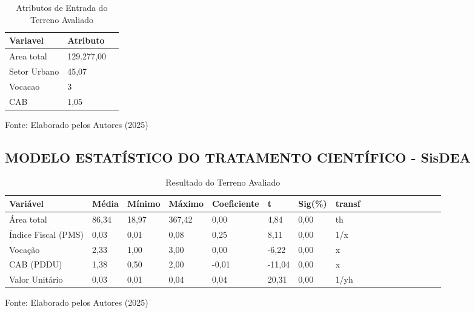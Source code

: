 \begin{table}[ht]
	\centering
	\begin{threeparttable}
		\caption{Atributos de Entrada do Terreno Avaliado }
		\label{Tabela-entrada-avaliado}
		\begin{tabular}{p{13.0cm}l  l}
			\toprule
			Variavel & Atributo    	 \\\midrule
			Area total	& 129.277,00 	 \\	 
			Setor Urbano	& 45,07 \\	 
			Vocacao	&3     \\	 
			CAB	& 1,05    \\\bottomrule
		\end{tabular}%
		\begin{tablenotes}
			\item [{\normalsize Fonte:     Elaborado pelos Autores (2025)}]  
		\end{tablenotes}
	\end{threeparttable}
\end{table}

\subsection{MODELO ESTATÍSTICO DO TRATAMENTO CIENTÍFICO - SisDEA}

\begin{table}[h!t]
	\centering
	\begin{threeparttable}
		\caption{Resultado do Terreno Avaliado }
		\label{Tabela-entrada-avalia5do}
		\begin{tabular}{p{2.5cm}lp{1.0cm}lp{2.5cm}lp{1.0cm}lp{1.5cm}lp{2.0cm}lp{1.0cm}lp{1.0cm}ll}
			\toprule
			Variável&	Média&	Mínimo&	Máximo&	Coeficiente&	t&	Sig(\%)	&transf 	 \\\midrule
			Área total&	86,34&	18,97&	367,42&	0,00&	4,84&	0,00&	th\\ 
			Índice Fiscal (PMS)&	0,03&	0,01&	0,08&	0,25&	8,11	&0,00&	1/x\\ 
			Vocação	&2,33&	1,00&	3,00&	0,00&	-6,22&	0,00&	x\\ 
			CAB (PDDU)	&1,38&	0,50&	2,00&	-0,01&	-11,04&	0,00&	x\\ 
			Valor Unitário	&0,03&	0,01&	0,04&	0,04&	20,31&	0,00	&1/yh \\\bottomrule
		\end{tabular}%
		\begin{tablenotes}
			\item [{\normalsize Fonte:     Elaborado pelos Autores (2025)}]  
		\end{tablenotes}
	\end{threeparttable}
\end{table}

